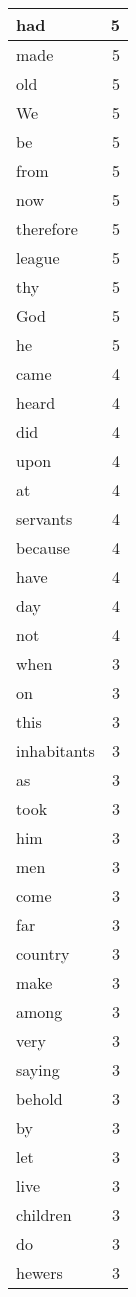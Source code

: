 \begin{center}
\begin{longtable}{l|r}
had & 5\\ \hline 
made & 5\\ \hline 
old & 5\\ \hline 
We & 5\\ \hline 
be & 5\\ \hline 
from & 5\\ \hline 
now & 5\\ \hline 
therefore & 5\\ \hline 
league & 5\\ \hline 
thy & 5\\ \hline 
God & 5\\ \hline 
he & 5\\ \hline 
came & 4\\ \hline 
heard & 4\\ \hline 
did & 4\\ \hline 
upon & 4\\ \hline 
at & 4\\ \hline 
servants & 4\\ \hline 
because & 4\\ \hline 
have & 4\\ \hline 
day & 4\\ \hline 
not & 4\\ \hline 
when & 3\\ \hline 
on & 3\\ \hline 
this & 3\\ \hline 
inhabitants & 3\\ \hline 
as & 3\\ \hline 
took & 3\\ \hline 
him & 3\\ \hline 
men & 3\\ \hline 
come & 3\\ \hline 
far & 3\\ \hline 
country & 3\\ \hline 
make & 3\\ \hline 
among & 3\\ \hline 
very & 3\\ \hline 
saying & 3\\ \hline 
behold & 3\\ \hline 
by & 3\\ \hline 
let & 3\\ \hline 
live & 3\\ \hline 
children & 3\\ \hline 
do & 3\\ \hline 
hewers & 3\\ \hline 

\end{longtable}
\end{center}
